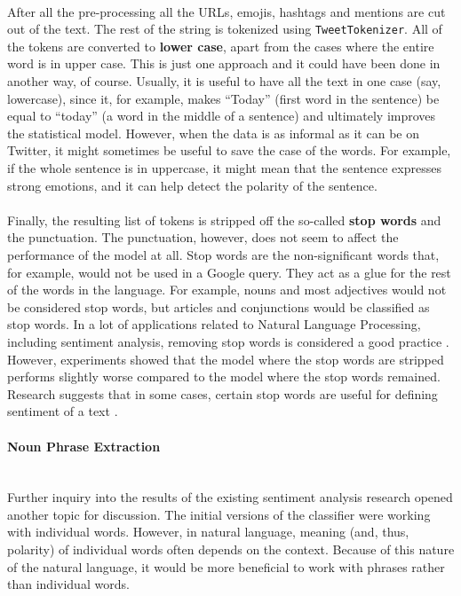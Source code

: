 \paragraph{}
After all the pre-processing all the URLs, emojis, hashtags and mentions are cut out of the text. The rest of the string is tokenized using \texttt{TweetTokenizer}. All of the tokens are converted to \textbf{lower case}, apart from the cases where the entire word is in upper case. This is just one approach and it could have been done in another way, of course. Usually, it is useful to have all the text in one case (say, lowercase), since it, for example, makes ``Today'' (first word in the sentence) be equal to ``today'' (a word in the middle of a sentence) and ultimately improves the statistical model. However, when the data is as informal as it can be on Twitter, it might sometimes be useful to save the case of the words. For example, if the whole sentence is in uppercase, it might mean that the sentence expresses strong emotions, and it can help detect the polarity of the sentence. 

\paragraph{}
Finally, the resulting list of tokens is stripped off the so-called \textbf{stop words} and the punctuation. 
The punctuation, however, does not seem to affect the performance of the model at all. Stop words are the non-significant words that, for example, would not be used in a Google query. They act as a glue for the rest of the words in the language. For example, nouns and most adjectives would not be considered stop words, but  articles and conjunctions would be classified as stop words. In a lot of applications related to Natural Language Processing, including sentiment analysis, removing stop words is considered a good practice \cite{poursepanj2013uottawa, kouloumpis2011twitter}. However, experiments showed that the model where the stop words are stripped performs slightly worse compared to the model where the stop words remained. Research suggests that in some cases, certain stop words are useful for defining sentiment of a text \cite{lin2009joint}. 


\paragraph{Noun Phrase Extraction}\mbox{}\\
Further inquiry into the results of the existing sentiment analysis research opened another topic for discussion. The initial versions of the classifier were working with individual words. However, in natural language, meaning (and, thus, polarity) of individual words often depends on the context. Because of this nature of the natural language, it would be more beneficial to work with phrases rather than individual words. 


